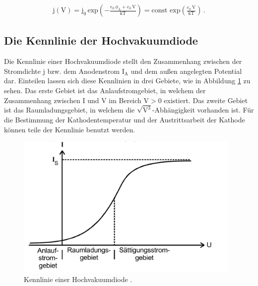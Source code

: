 \begin{align}
\text{j}(\text{V}) = \text{j}_{0}\, \text{exp} \left(- \frac{e_{0}\,\phi_{\text{A}} + e_{0}\, \text{V} }{\text{kT}}\right) = \text{const}\,\, \text{exp} \left(\frac{e_{0}\, \text{V}}{\text{kT}} \right) \,. \label{4}
\end{align}

\subsection{Die Kennlinie der Hochvakuumdiode}

\begin{flushleft}
    Die Kennlinie einer Hochvakuumdiode stellt den Zusammenhang zwischen der Stromdichte j bzw. dem Anodenstrom $\text{I}_{\text{A}}$ und dem außen angelegten Potential dar.
    Einteilen lassen sich diese Kennlinien in drei Gebiete, wie in Abbildung \ref{Abbildung2} zu sehen.
    Das erste Gebiet ist das Anlaufstromgebiet, in welchem der Zusammenhang zwischen I und V im Bereich $\text{V} > 0$ existiert.
    Das zweite Gebiet ist das Raumladungsgebiet, in welchem die $\sqrt{\text{V}^3}$-Abhängigkeit vorhanden ist.
    Für die Bestimmung der Kathodentemperatur und der Austrittsarbeit der Kathode können teile der Kennlinie benutzt werden.
\end{flushleft}

\begin{figure}[H]
    \centering
    \includegraphics[height=70mm]{bilder/A2.png}
    \caption{Kennlinie einer Hochvakuumdiode \cite{a1}. \label{Abbildung2} }
\end{figure}
